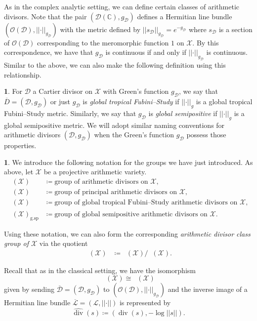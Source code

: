 \documentclass[11pt,reqno]{amsart}
\newcommand{\mC}{\mathbb{C}}
\newcommand{\cX}{\mathcal{X}}
\newcommand{\cD}{\mathcal{D}}
\newcommand{\cO}{\mathcal{O}}
\newcommand{\cL}{\mathcal{L}}
\newcommand{\nrm}[1]{\left|\left |#1\right |\right |}
\theoremstyle{theorem}
\numberwithin{equation}{subsection}
\numberwithin{equation}{subsection}
\theoremstyle{definition}
\newtheorem{definition}[subsubsection]{\text{Definition}}
\newtheorem{notation}[subsubsection]{\text{Notation}}
\theoremstyle{remark}
\numberwithin{equation}{subsubsection} \numberwithin{figure}{section}
\DeclareMathOperator{\aPic}{\widehat{Pic}}
\DeclareMathOperator{\ddiv}{div}
\DeclareMathOperator{\aDiv}{\widehat{Div}}
\DeclareMathOperator{\aCaCl}{\widehat{CaCl}}
\DeclareMathOperator{\aPr}{\widehat{Pr}}
\newcommand{\cdef}[1]{\textsf{\textit{#1}}}
\DeclareMathOperator{\gtFS}{g.FS^{\tau}}
\DeclareMathOperator{\gsemip}{g.sp}
\begin{document}
As in the complex analytic setting, we can define certain classes of arithmetic divisors. 
Note that the pair $(\cD(\mC),g_{\cD})$ defines a Hermitian line bundle $(\cO(\cD),\nrm{\cdot}_{g_{\cD}})$ with the metric defined by $\nrm{s_{\cD}}_{g_{\cD}} = e^{-{g_{\cD}}}$ where $s_{\cD}$ is a section of $\cO(\cD)$ corresponding to the meromorphic function $1$ on $\cX.$
By this correspondence, we have that $g_{\cD}$ is continuous if and only if $\nrm{\cdot}_{g_{\cD}}$ is continuous. 
Similar to the above, we can also make the following definition using this relationship. 

\begin{definition}
For $\cD$ a Cartier divisor on $\cX$ with Green's function $g_{\cD}$, we say that $\overline{D} = (\cD,g_{\cD})$ or just $g_{\cD}$ is \cdef{global tropical Fubini--Study} if $\nrm{\cdot}_g$ is a global tropical Fubini--Study metric. 
Similarly, we say that $g_{\cD}$ is \cdef{global semipositive} if $\nrm{\cdot}_g$ is a global semipositive metric. 
We will adopt similar naming conventions for arithmetic divisors $(\cD,g_{\cD})$ when the Green's function $g_{\cD}$ possess those properties. 
\end{definition}

\begin{notation}
We introduce the following notation for the groups we have just introduced. 
As above, let $\cX$ be a projective arithmetic variety.
\begin{align*}
\aDiv(\cX) &\coloneqq \text{group of arithmetic divisors on $\cX$},\\
\aPr(\cX) &\coloneqq \text{group of principal arithmetic divisors on $\cX$},\\
\aDiv(\cX)_{\gtFS} &\coloneqq \text{group of global tropical Fubini--Study arithmetic divisors on $\cX$},\\
\aDiv(\cX)_{\gsemip} &\coloneqq \text{group of global semipositive arithmetic divisors on $\cX$}.
\end{align*}

Using these notation, we can also form the corresponding \cdef{arithmetic divisor class group of $\cX$} via the quotient
\begin{align*}
\aCaCl(\cX) &\coloneqq \aDiv(\cX)/\aPr(\cX).  
\end{align*}
\end{notation}
Recall that as in the classical setting, we have the isomorphism
\[
\aCaCl(\cX)\cong \aPic(\cX)
\]
given by sending $\overline{\cD} = (\cD,g_{\cD})$ to $(\cO(\cD),\nrm{\cdot}_{g_{\cD}})$ and the inverse image of a Hermitian line bundle $\overline{\cL} = (\cL,\nrm{\cdot})$ is represented by 
\[
\widehat{\ddiv}(s) \coloneqq (\ddiv(s),-\log\nrm{s}). 
\]
\end{document}
